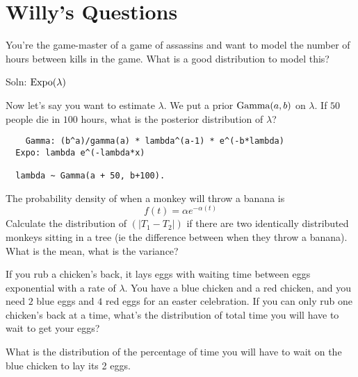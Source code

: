 \documentclass[11pt]{article}
\begin{document}
\pagebreak
\section{Willy's Questions}
\begin{exercise}[Assasins]
You’re the game-master of a game of assassins and want to model the number of hours between kills in the game. What is a good distribution to model this?
\end{exercise}

\begin{solution}
  Soln: $\textrm{Expo}(\lambda)$
\end{solution}

\begin{exercise}
Now let’s say you want to estimate $\lambda$. We put a prior $\textrm{Gamma}(a,b)$ on $\lambda$. If $50$ people die in $100$ hours, what is the posterior distribution of $\lambda$?
\end{exercise}
\begin{solution}
  \begin{verbatim}
    Gamma: (b^a)/gamma(a) * lambda^(a-1) * e^(-b*lambda)
  Expo: lambda e^(-lambda*x)

  lambda ~ Gamma(a + 50, b+100).
    \end{verbatim}
\end{solution}

\begin{exercise}
The probability density of when a monkey will throw a banana is
$$
f(t)=\alpha e^{-\alpha(t)}
$$
Calculate the distribution of $(|T_1 - T_2|)$ if there are two identically distributed monkeys sitting in a tree (ie the difference between when they throw a banana). What is the mean, what is the variance?
\end{exercise}
\vspace{2in}

\begin{exercise}
If you rub a chicken’s back, it lays eggs with waiting time between eggs exponential with a rate of $\lambda$. You have a blue chicken and a red chicken, and you need $2$ blue eggs and $4$ red eggs for an easter celebration. If you can only rub one chicken’s back at a time, what’s the distribution of total time you will have to wait to get your eggs?
\end{exercise}
\vspace{2in}

\begin{exercise}
What is the distribution of the percentage of time you will have to wait on the blue chicken to lay its 2 eggs.
\end{exercise}
\vspace{2in}
\end{document}
